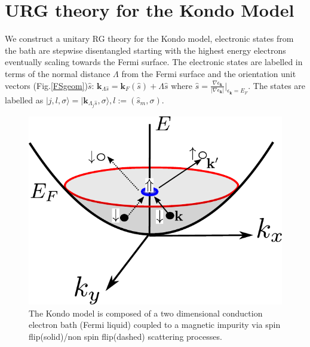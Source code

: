 \documentclass[aps,prx,preprint,groupedaddress]{revtex4-2}
\begin{document}
\section{URG theory for the Kondo Model}
\par\noindent
We construct a unitary RG theory for the Kondo model, electronic states from the bath are stepwise disentangled starting with the highest energy electrons eventually scaling towards the Fermi surface. The electronic states are labelled in terms of the normal distance $\Lambda$ from the Fermi surface and the orientation unit vectors (Fig.\ref{FSgeom})$\hat{s}$: $\mathbf{k}_{\Lambda\hat{s}}=\mathbf{k}_{F}(\hat{s})+\Lambda\hat{s}$ where $\hat{s}=\frac{\nabla\epsilon_{\mathbf{k}}}{|\nabla\epsilon_{\mathbf{k}}|}|_{\epsilon_{\mathbf{k}}=E_{F}}$. The states are labelled as
$|j,l,\sigma\rangle = |\mathbf{k}_{\Lambda_{j}\hat{s}},\sigma\rangle, l:=(\hat{s}_{m},\sigma)$. 
\begin{figure}
\includegraphics[scale=0.75]{kondoSetup.pdf}
\caption{The Kondo model is composed of a two dimensional conduction electron bath (Fermi liquid) coupled to a magnetic impurity via spin flip(solid)/non spin flip(dashed) scattering processes.}
\end{figure}
\end{document}
